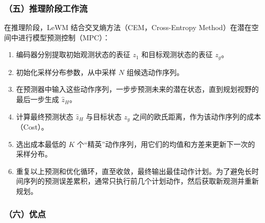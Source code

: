 \hypertarget{ux4e94ux63a8ux7406ux9636ux6bb5ux5de5ux4f5cux6d41}{%
\subsubsection{（五）推理阶段工作流}\label{ux4e94ux63a8ux7406ux9636ux6bb5ux5de5ux4f5cux6d41}}

在推理阶段，LeWM 结合交叉熵方法（CEM，Cross-Entropy Method）在潜在空间中进行模型预测控制（MPC）：

\begin{enumerate}
\def\labelenumi{\arabic{enumi}.}
\tightlist
\item
  编码器分别提取初始观测状态的表征 \(z_1\) 和目标观测状态的表征 \(z_g\)。
\item
  初始化采样分布参数，从中采样 \(N\) 组候选动作序列。
\item
  在预测器中输入这些动作序列，一步步预测未来的潜在状态，直到规划视野的最后一步生成 \(\hat{z}_H\)。
\item
  计算最终预测状态 \(\hat{z}_H\) 与目标状态 \(z_g\) 之间的欧氏距离，作为该动作序列的成本（Cost）。
\item
  选出成本最低的 \(K\) 个``精英''动作序列，用它们的均值和方差来更新下一次的采样分布。
\item
  重复以上预测和优化循环，直至收敛，最终输出最佳动作计划。为了避免长时间序列的预测误差累积，通常只执行前几个计划动作，然后获取新观测并重新规划。
\end{enumerate}

\hypertarget{ux516dux4f18ux70b9}{%
\subsubsection{（六）优点}\label{ux516dux4f18ux70b9}}

